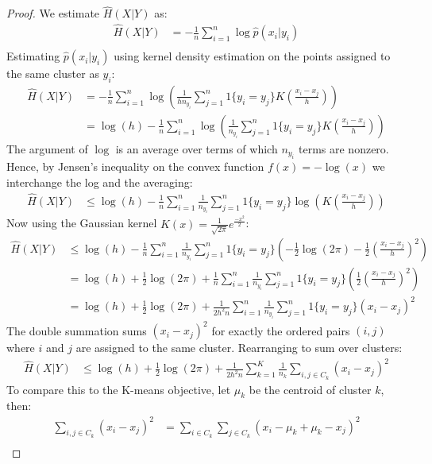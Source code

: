 \documentclass{article} %
\begin{document}
\begin{proof}
We estimate $\hat{H}(X|Y)$ as:
\begin{align*}
\hat{H}(X|Y) &= -\frac{1}{n}\sum_{i=1}^n \log \hat{p}(x_i | y_i)\\
\end{align*}
Estimating $\hat{p}(x_i | y_i)$ using kernel density estimation on the points assigned to the same cluster as $y_i$:
\begin{align*}
\hat{H}(X|Y) &=  -\frac{1}{n}\sum_{i=1}^n \log(\frac{1}{hn_{y_i}} \sum_{j=1}^n 1\{y_i = y_j\} K(\frac{x_i - x_j}{h}))\\
&=  \log(h) -\frac{1}{n}\sum_{i=1}^n \log(\frac{1}{n_{y_i}} \sum_{j=1}^n 1\{y_i = y_j\} K(\frac{x_i - x_j}{h}))
\end{align*}
The argument of $\log$ is an average over terms of which $n_{y_i}$ terms are
nonzero. Hence, by Jensen's inequality on the convex function $f(x) = -\log(x)$
we interchange the log and the averaging:
\begin{align*}
\hat{H}(X|Y) &\le  \log(h) -\frac{1}{n}\sum_{i=1}^n \frac{1}{n_{y_i}} \sum_{j=1}^n 1\{y_i = y_j\} \log(K(\frac{x_i - x_j}{h}))
\end{align*}
Now using the Gaussian kernel $K(x) = \frac{1}{\sqrt{2\pi}} e^{\frac{-x^2}{2}}$:
\begin{align*}
\hat{H}(X|Y) &\le  \log(h) -\frac{1}{n}\sum_{i=1}^n \frac{1}{n_{y_i}} \sum_{j=1}^n 1\{y_i = y_j\}(-\frac{1}{2}\log (2 \pi) -\frac{1}{2}(\frac{x_i - x_j}{h})^2 )\\
&=  \log(h) + \frac{1}{2}\log(2 \pi) + \frac{1}{n}\sum_{i=1}^n \frac{1}{n_{y_i}} \sum_{j=1}^n 1\{y_i = y_j\}(\frac{1}{2}(\frac{x_i - x_j}{h})^2 )\\
&=  \log(h) + \frac{1}{2}\log(2 \pi) + \frac{1}{2h^2 n}\sum_{i=1}^n \frac{1}{n_{y_i}} \sum_{j=1}^n 1\{y_i = y_j\}(x_i - x_j)^2
\end{align*}
The double summation sums $(x_i - x_j)^2$ for exactly the ordered pairs $(i,j)$ where $i$ and $j$ are assigned to the same cluster. Rearranging to sum over clusters:
\begin{align}
\hat{H}(X|Y) &\le  \log(h) + \frac{1}{2}\log(2 \pi) + \frac{1}{2h^2 n} \sum_{k=1}^K \frac{1}{n_k}\sum_{i,j \in C_k} (x_i - x_j)^2  \label{eq:1}
\end{align}
To compare this to the K-means objective, let $\mu_k$ be the centroid of cluster $k$, then:
\begin{align*}
\sum_{i,j \in C_k} (x_i - x_j)^2 &= \sum_{i \in C_k} \sum_{j \in C_k} (x_i - \mu_k + \mu_k - x_j)^2 \\

\end{align*}
\end{proof}
\end{document}
